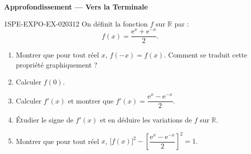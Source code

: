 \begin{center}\textbf{Approfondissement — Vers la Terminale}\end{center}
\begin{exercice}{1SPE-EXPO-EX-020}{3}{12}
On définit la fonction $f$ sur $\mathbb{R}$ par :
\[ f(x) = \frac{\mathrm{e}^x + \mathrm{e}^{-x}}{2}. \]
\begin{enumerate}
  \item Montrer que pour tout réel $x$, $f(-x) = f(x)$. Comment se traduit cette propriété graphiquement ?
  \item Calculer $f(0)$.
  \item Calculer $f'(x)$ et montrer que $f'(x) = \dfrac{\mathrm{e}^x - \mathrm{e}^{-x}}{2}$.
  \item Étudier le signe de $f'(x)$ et en déduire les variations de $f$ sur $\mathbb{R}$.
  \item Montrer que pour tout réel $x$, $\bigl[f(x)\bigr]^2 - \left[\dfrac{\mathrm{e}^x - \mathrm{e}^{-x}}{2}\right]^2 = 1$.
\end{enumerate}
\end{exercice}
